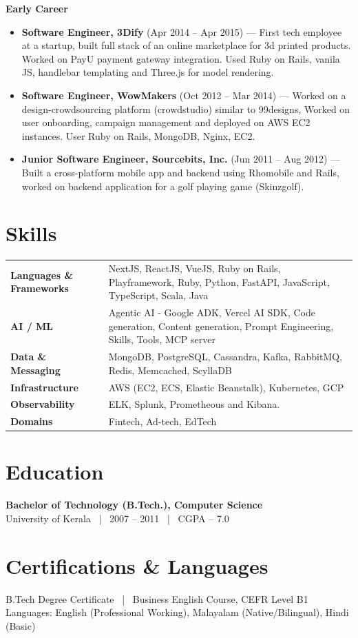 \documentclass[10.5pt,a4paper]{article}
\begin{document}
{\bfseries\color{navy} Early Career}\par\vspace{2pt}
\begin{itemize}[leftmargin=16pt, itemsep=1pt, topsep=2pt, parsep=0pt]
  \item \textbf{Software Engineer, 3Dify} (Apr 2014 -- Apr 2015) --- First tech employee at a startup, built full stack of an online marketplace for 3d printed products. Worked on PayU payment gateway integration. Used Ruby on Rails, vanila JS, handlebar templating and Three.js for model rendering.
  \item \textbf{Software Engineer, WowMakers} (Oct 2012 -- Mar 2014) --- Worked on a design-crowdsourcing platform (crowdstudio) similar to 99designs, Worked on user onboarding, campaign management and deployed on AWS EC2 instances. User Ruby on Rails, MongoDB, Nginx, EC2.
  \item \textbf{Junior Software Engineer, Sourcebits, Inc.} (Jun 2011 -- Aug 2012) --- Built a cross-platform mobile app and backend using Rhomobile and Rails, worked on backend application for a golf playing game (Skinzgolf).
\end{itemize}

\section{Skills}
\begin{tabular}{@{}p{2.05in}p{4.85in}@{}}
\textbf{Languages \& Frameworks} & NextJS, ReactJS, VueJS, Ruby on Rails, Playframework, Ruby, Python, FastAPI, JavaScript, TypeScript, Scala, Java \\[4pt]
\textbf{AI / ML} & Agentic AI - Google ADK, Vercel AI SDK, Code generation, Content generation, Prompt Engineering, Skills, Tools, MCP server \\[4pt]
\textbf{Data \& Messaging} & MongoDB, PostgreSQL, Cassandra, Kafka, RabbitMQ, Redis, Memcached, ScyllaDB \\[4pt]
\textbf{Infrastructure} & AWS (EC2, ECS, Elastic Beanstalk), Kubernetes, GCP \\[4pt]
\textbf{Observability} & ELK, Splunk, Prometheous and Kibana. \\
\textbf{Domains} & Fintech, Ad-tech, EdTech \\
\end{tabular}

\section{Education}
\textbf{Bachelor of Technology (B.Tech.), Computer Science} \\
University of Kerala \ | \ 2007 -- 2011 \ | \ CGPA -- 7.0

\section{Certifications \& Languages}
B.Tech Degree Certificate \ | \ Business English Course, CEFR Level B1 \\
Languages: English (Professional Working), Malayalam (Native/Bilingual), Hindi (Basic)
\end{document}
